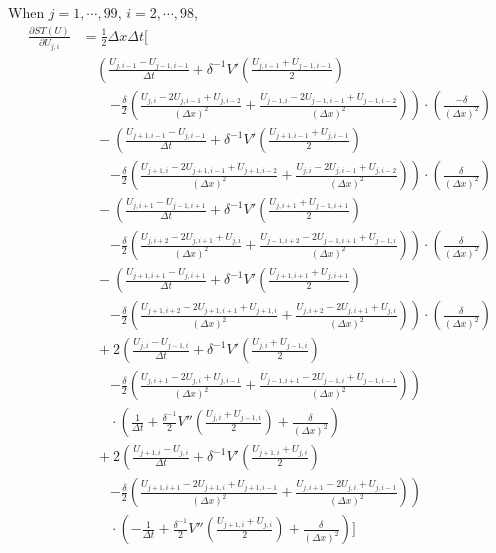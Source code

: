 \documentclass{article}
\begin{document}
When $j = 1,\cdots,99$, $i = 2,\cdots,98$,
\begin{align*}
  \frac{\partial ST(U)}{\partial U_{j,i}} &= \frac{1}{2} \Delta x \Delta t \Bigg[ \\
  &\quad \left( \frac{U_{j,i-1} - U_{j-1,i-1}}{\Delta t} + \delta^{-1} V'\left( \frac{U_{j,i-1} + U_{j-1,i-1}}{2} \right) \right. \\
  &\qquad \left. - \frac{\delta}{2} \left( \frac{U_{j,i} - 2U_{j,i-1} + U_{j,i-2}}{(\Delta x)^2} + \frac{U_{j-1,i} - 2U_{j-1,i-1} + U_{j-1,i-2}}{(\Delta x)^2} \right) \right) \cdot \left( \frac{-\delta}{(\Delta x)^2} \right) \\
  &\quad - \left( \frac{U_{j+1,i-1} - U_{j,i-1}}{\Delta t} + \delta^{-1} V'\left( \frac{U_{j+1,i-1} + U_{j,i-1}}{2} \right) \right. \\
  &\qquad \left. - \frac{\delta}{2} \left( \frac{U_{j+1,i} - 2U_{j+1,i-1} + U_{j+1,i-2}}{(\Delta x)^2} + \frac{U_{j,i} - 2U_{j,i-1} + U_{j,i-2}}{(\Delta x)^2} \right) \right) \cdot \left( \frac{\delta}{(\Delta x)^2} \right) \\
  &\quad - \left( \frac{U_{j,i+1} - U_{j-1,i+1}}{\Delta t} + \delta^{-1} V'\left( \frac{U_{j,i+1} + U_{j-1,i+1}}{2} \right) \right. \\
  &\qquad \left. - \frac{\delta}{2} \left( \frac{U_{j,i+2} - 2U_{j,i+1} + U_{j,i}}{(\Delta x)^2} + \frac{U_{j-1,i+2} - 2U_{j-1,i+1} + U_{j-1,i}}{(\Delta x)^2} \right) \right) \cdot \left( \frac{\delta}{(\Delta x)^2} \right) \\
  &\quad - \left( \frac{U_{j+1,i+1} - U_{j,i+1}}{\Delta t} + \delta^{-1} V'\left( \frac{U_{j+1,i+1} + U_{j,i+1}}{2} \right) \right. \\
  &\qquad \left. - \frac{\delta}{2} \left( \frac{U_{j+1,i+2} - 2U_{j+1,i+1} + U_{j+1,i}}{(\Delta x)^2} + \frac{U_{j,i+2} - 2U_{j,i+1} + U_{j,i}}{(\Delta x)^2} \right) \right) \cdot \left( \frac{\delta}{(\Delta x)^2} \right) \\
  &\quad + 2 \left( \frac{U_{j,i} - U_{j-1,i}}{\Delta t} + \delta^{-1} V'\left( \frac{U_{j,i} + U_{j-1,i}}{2} \right) \right. \\
  &\qquad \left. - \frac{\delta}{2} \left( \frac{U_{j,i+1} - 2U_{j,i} + U_{j,i-1}}{(\Delta x)^2} + \frac{U_{j-1,i+1} - 2U_{j-1,i} + U_{j-1,i-1}}{(\Delta x)^2} \right) \right) \\
  &\qquad \cdot \left( \frac{1}{\Delta t} + \frac{\delta^{-1}}{2} V''\left( \frac{U_{j,i} + U_{j-1,i}}{2} \right) + \frac{\delta}{(\Delta x)^2} \right) \\
  &\quad + 2 \left( \frac{U_{j+1,i} - U_{j,i}}{\Delta t} + \delta^{-1} V'\left( \frac{U_{j+1,i} + U_{j,i}}{2} \right) \right. \\
  &\qquad \left. - \frac{\delta}{2} \left( \frac{U_{j+1,i+1} - 2U_{j+1,i} + U_{j+1,i-1}}{(\Delta x)^2} + \frac{U_{j,i+1} - 2U_{j,i} + U_{j,i-1}}{(\Delta x)^2} \right) \right) \\
  &\qquad \cdot \left( -\frac{1}{\Delta t} + \frac{\delta^{-1}}{2} V''\left( \frac{U_{j+1,i} + U_{j,i}}{2} \right) + \frac{\delta}{(\Delta x)^2} \right) \Bigg]
\end{align*}  
\end{document}

